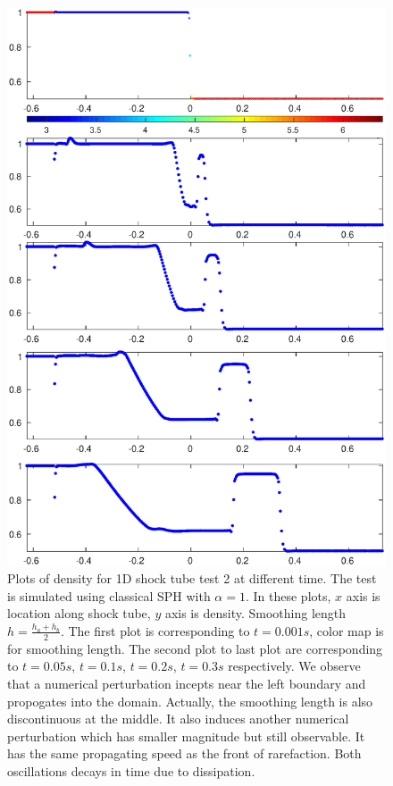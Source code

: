 \documentclass[review]{elsarticle}
\begin{document}
\begin{figure}[H]
\centering
\includegraphics[width=0.90 \textwidth]{App-Figure/Perturbation-ME2}
\caption{Plots of density for 1D shock tube test 2 at different time. The test is simulated using classical SPH with $\alpha = 1$. In these plots, $x$ axis is location along shock tube, $y$ axis is density. Smoothing length $h = \frac{h_a + h_b}{2}$. The first plot is corresponding to $t=0.001s$, color map is for smoothing length. The second plot to last plot are corresponding to $t=0.05s$, $t=0.1s$, $t=0.2s$, $t=0.3s$ respectively. We observe that a numerical perturbation incepts near the left boundary and propogates into the domain. Actually, the smoothing length is also discontinuous at the middle. It also induces another numerical perturbation which has smaller magnitude but still observable. It has the same propagating speed as the front of rarefaction. Both oscillations decays in time due to dissipation.}
\label{fig:Perturbation-ME2}
\end{figure}
\end{document}
